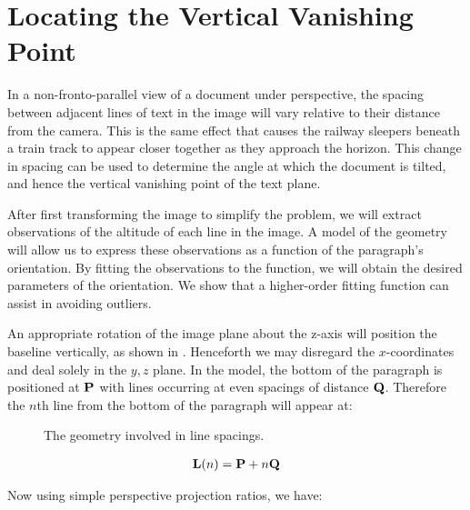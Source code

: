 
\section{Locating the Vertical Vanishing Point} \label{sec-vertvanish}


In a non-fronto-parallel view of a document under perspective, the spacing between adjacent lines of text in the image will vary relative to their distance from the camera.  This is the same effect that causes the railway sleepers beneath a train track to appear closer together as they approach the horizon. This change in spacing can be used to determine the angle at which the document is tilted, and hence the vertical vanishing point of the text plane.

After first transforming the image to simplify the problem, we will extract observations of the altitude of each line in the image.  A model of the geometry will allow us to express these observations as a function of the paragraph's orientation.  By fitting the observations to the function, we will obtain the desired parameters of the orientation.  We show that a higher-order fitting function can assist in avoiding outliers.

An appropriate rotation of the image plane about the z-axis will position the baseline vertically, as shown in .  Henceforth we may disregard the $x$-coordinates and deal solely in the $y,z$ plane.
In the model, the bottom of the paragraph is positioned at ${ \bf P }$ with lines occurring at even spacings of distance ${ \bf Q }$.  Therefore the $n$th line from the bottom of the paragraph will appear at:

\begin{figure}[t]
\centering
\begin{center}
\caption{The geometry involved in line spacings.}
\label{zyspacings}
\end{center}
\end{figure}

\begin{eqnarray}
{ \bf L }(n) = { \bf P }+n{ \bf Q } \label{nthline}
\end{eqnarray}

{\parindent 0mm
Now using simple perspective projection ratios, we have: 
}

